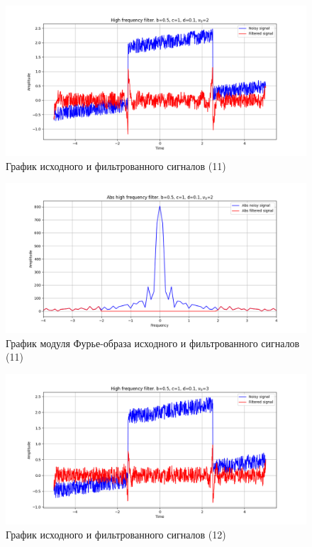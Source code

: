 \documentclass[a4paper, 12pt]{article}
\begin{document}
    \begin{figure}[!htb]
        \centering
        \includegraphics[scale=0.48]{11_u_flt_u_nolow.png}
        \captionsetup{skip=0pt}
        \caption{График исходного и фильтрованного сигналов (11)}
        \label{fig:fig47}
    \end{figure}
    \begin{figure}[!htb]
        \centering
        \includegraphics[scale=0.48]{11_abs_u_U_nolow.png}
        \captionsetup{skip=0pt}
        \caption{График модуля Фурье-образа исходного и фильтрованного сигналов (11)}
        \label{fig:fig48}
    \end{figure}
    \begin{figure}[!htb]
        \centering
        \includegraphics[scale=0.48]{12_u_flt_u_nolow.png}
        \captionsetup{skip=0pt}
        \caption{График исходного и фильтрованного сигналов (12)}
        \label{fig:fig49}
    \end{figure}
\end{document}

